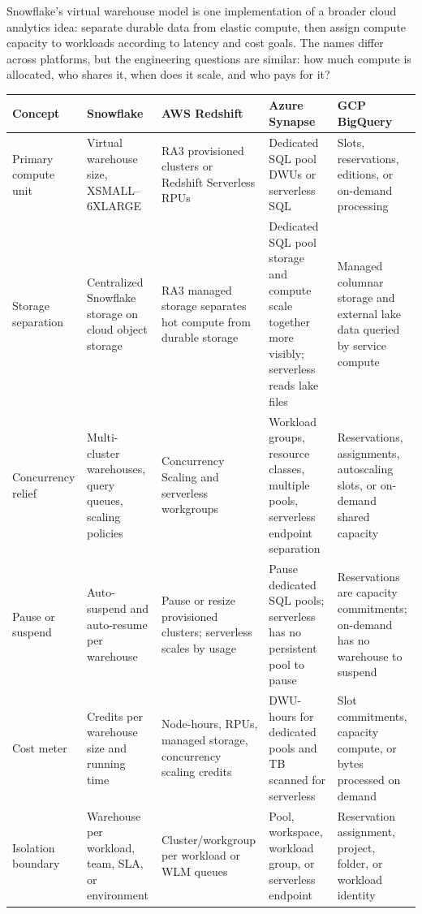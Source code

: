 \begin{crosscloud}
Snowflake's virtual warehouse model is one implementation of a broader cloud analytics idea: separate durable data from elastic compute, then assign compute capacity to workloads according to latency and cost goals. The names differ across platforms, but the engineering questions are similar: how much compute is allocated, who shares it, when does it scale, and who pays for it?

\vspace{2mm}
{\footnotesize
\begin{tabular}{@{}p{2.8cm}p{3.0cm}p{3.0cm}p{3.0cm}p{3.0cm}@{}}
\toprule
\textbf{Concept} & \textbf{Snowflake} & \textbf{AWS Redshift} & \textbf{Azure Synapse} & \textbf{GCP BigQuery} \\
\midrule
Primary compute unit & Virtual warehouse size, XSMALL--6XLARGE & RA3 provisioned clusters or Redshift Serverless RPUs & Dedicated SQL pool DWUs or serverless SQL & Slots, reservations, editions, or on-demand processing \\
Storage separation & Centralized Snowflake storage on cloud object storage & RA3 managed storage separates hot compute from durable storage & Dedicated SQL pool storage and compute scale together more visibly; serverless reads lake files & Managed columnar storage and external lake data queried by service compute \\
Concurrency relief & Multi-cluster warehouses, query queues, scaling policies & Concurrency Scaling and serverless workgroups & Workload groups, resource classes, multiple pools, serverless endpoint separation & Reservations, assignments, autoscaling slots, or on-demand shared capacity \\
Pause or suspend & Auto-suspend and auto-resume per warehouse & Pause or resize provisioned clusters; serverless scales by usage & Pause dedicated SQL pools; serverless has no persistent pool to pause & Reservations are capacity commitments; on-demand has no warehouse to suspend \\
Cost meter & Credits per warehouse size and running time & Node-hours, RPUs, managed storage, concurrency scaling credits & DWU-hours for dedicated pools and TB scanned for serverless & Slot commitments, capacity compute, or bytes processed on demand \\
Isolation boundary & Warehouse per workload, team, SLA, or environment & Cluster/workgroup per workload or WLM queues & Pool, workspace, workload group, or serverless endpoint & Reservation assignment, project, folder, or workload identity \\
\bottomrule
\end{tabular}}


\end{crosscloud}
